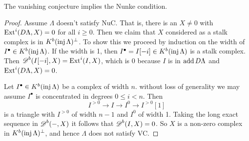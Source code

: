 \begin{theorem} \cite[1.2]{Hap93} \label{thm:VC_implies_Nuc}
	The vanishing conjecture implies the Nunke condition.
	\begin{proof}
		Assume $\Lambda$ doesn't satisfy NuC. That is, there is an $X \neq 0$ with $\operatorname{Ext}^i(D\Lambda, X) = 0$ for all $i \geq 0$. Then we claim that $X$ considered as a stalk complex is in $K^b(\operatorname{inj}\Lambda)^\perp$. To show this we proceed by induction on the width of $I^\bullet \in K^b(\operatorname{inj}\Lambda)$. If the width is 1, then $I^\bullet = I[-i] \in K^b(\operatorname{inj}\Lambda)$ is a stalk complex. Then $\operatorname{\mathscr{D}}^b(I[-i], X) = \operatorname{Ext}^i(I, X)$, which is 0 because $I$ is in $\operatorname{add} D\Lambda$ and $\operatorname{Ext}^i(D\Lambda, X)=0$.
		
		Let $I^\bullet \in K^b(\operatorname{inj}\Lambda)$ be a complex of width $n$. without loss of generality we may assume $I^\bullet$ is concentrated in degrees $0 \leq i < n$. Then 
		$$I^{>0} \to I \to I^{0} \to I^{>0}[1]$$ 
		is a triangle with $I^{>0}$ of width $n-1$ and $I^0$ of width 1. Taking the long exact sequence in $\operatorname{\mathscr{D}}^b(-,X)$ it follows that $\operatorname{\mathscr{D}}^b(I, X)=0$. So $X$ is a non-zero complex in $K^b(\operatorname{inj}\Lambda)^\perp$, and hence $\Lambda$ does not satisfy VC.
	\end{proof}
\end{theorem}

%
%		

